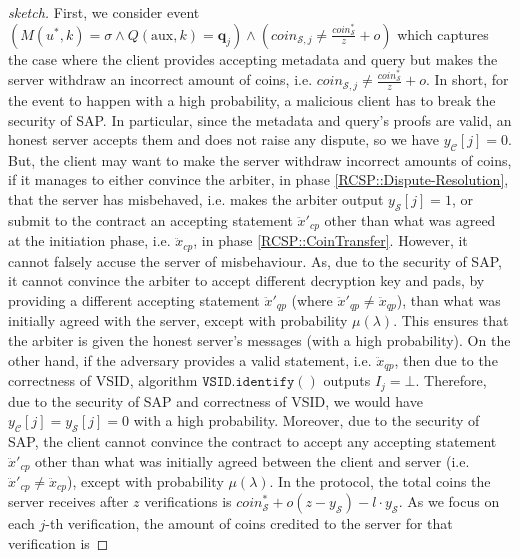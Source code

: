 \begin{proof}[sketch]
  First, we consider event  $(M(u^{\scriptscriptstyle *},k)= \sigma  \wedge Q(\text{aux},k)= \bm{q}_{\scriptscriptstyle j}) \wedge
  (coin_{\scriptscriptstyle\mathcal{S},j}\neq  \frac{coin_{\scriptscriptstyle\mathcal S}^{\scriptscriptstyle*}}{z}+o)$ which captures the case where the client provides  accepting metadata and query  but makes the server withdraw an incorrect amount of coins, i.e. $coin_{\scriptscriptstyle\mathcal{S},j}\neq  \frac{coin_{\scriptscriptstyle\mathcal S}^{\scriptscriptstyle*}}{z}+o$. In short, for the event to  happen with a high probability, a malicious client has to break the security of SAP. In particular, since the metadata and query's proofs are valid, an honest server accepts them and does not raise any dispute, so we have $y_{\scriptscriptstyle\mathcal{C}}[j]=0$.  But, the client may want to  make the server  withdraw incorrect amounts of coins, if it manages to either convince the arbiter, in phase \ref{RCSP::Dispute-Resolution}, that the server has misbehaved, i.e. makes the arbiter output $y_{\scriptscriptstyle\mathcal{S}}[j]=1$, or submit to the contract  an accepting  statement $\ddot{x}'_{\scriptscriptstyle cp}$ other than what was agreed at the initiation phase, i.e. $\ddot{x}_{\scriptscriptstyle cp}$, in phase \ref{RCSP::CoinTransfer}. However, it cannot falsely accuse the server of misbehaviour. As,  due to the security of SAP, it cannot  convince the arbiter to accept different decryption key and pads, by providing a different accepting statement $\ddot{x}'_{\scriptscriptstyle qp}$  (where $\ddot{x}'_{\scriptscriptstyle qp}\neq \ddot{x}_{\scriptscriptstyle qp}$), than what was initially agreed with the server, except with  probability $\mu(\lambda)$. This ensures that  the arbiter is given the honest server's messages (with a high probability). On the other hand, if the adversary provides a valid statement, i.e. $\ddot{x}_{\scriptscriptstyle qp}$, then due to the correctness of VSID, algorithm $\mathtt{VSID.identify}()$ outputs $I_{\scriptscriptstyle j}=\bot$. Therefore, due to the security of SAP and correctness of VSID,  we would have $y_{\scriptscriptstyle\mathcal{C}}[j]=y_{\scriptscriptstyle\mathcal{S}}[j]=0$ with a high probability. Moreover,  due to the security of SAP, the client cannot convince the contract to accept any accepting statement $\ddot{x}'_{\scriptscriptstyle cp}$ other than what was initially agreed  between the client and server (i.e. $\ddot{x}'_{\scriptscriptstyle cp}\neq \ddot{x}_{\scriptscriptstyle cp}$), except with   probability $\mu(\lambda)$.  In the protocol, the total coins the server receives after $z$ verifications is $coin^{\scriptscriptstyle *}_{\scriptscriptstyle\mathcal S}+o(z-y_{\scriptscriptstyle\mathcal S})-l\cdot y_{\scriptscriptstyle\mathcal S}$. As we focus on each $j$-th verification,  the amount of  coins credited to the server for that verification is
  

\end{proof}
